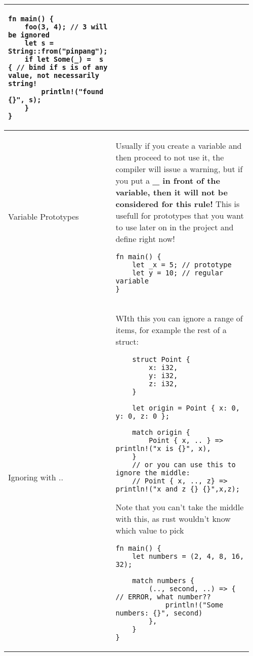 \documentclass[main.tex,fontsize=8pt,paper=a4,paper=portrait,DIV=calc,]{scrartcl}
\begin{document}
\begin{table}[ht!]
\begin{tabular}{|m{0.2\linewidth}|m{0.755\linewidth}|}
\begin{lstlisting}
fn main() {
    foo(3, 4); // 3 will be ignored
    let s = String::from("pinpang");
    if let Some(_) =  s { // bind if s is of any value, not necessarily string!
        println!("found {}", s);
    }
}
\end{lstlisting}\\
\hline
Variable Prototypes & 
\textcolor{OliveGreen}{Usually if you create a variable and then proceed to not use it, the compiler will issue a warning, but if you put a \textbf{\_ in front of the variable, then it will not be considered for this rule!}}\newline
This is usefull for prototypes that you want to use later on in the project and define right now!\newline
\begin{lstlisting}
fn main() {
    let _x = 5; // prototype
    let y = 10; // regular variable
}
\end{lstlisting}\\
\hline
Ignoring with .. & 
WIth this you can ignore a range of items, for example the rest of a struct:\newline
\begin{lstlisting}
    struct Point {
        x: i32,
        y: i32,
        z: i32,
    }

    let origin = Point { x: 0, y: 0, z: 0 };

    match origin {
        Point { x, .. } => println!("x is {}", x),
    }
    // or you can use this to ignore the middle:
    // Point { x, .., z} => println!("x and z {} {}",x,z);
\end{lstlisting} 
\textcolor{OliveGreen}{Note that you can't take the middle with this, as rust wouldn't know which value to pick}\newline
\begin{lstlisting}
fn main() {
    let numbers = (2, 4, 8, 16, 32);

    match numbers {
        (.., second, ..) => { // ERROR, what number??
            println!("Some numbers: {}", second)
        },
    }
}
\end{lstlisting}\\
\hline
\end{tabular}
\end{table}
\pagebreak
\end{document}
